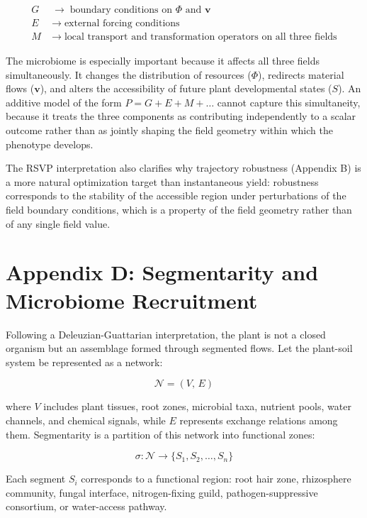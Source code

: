 \documentclass[11pt, a4paper]{article}
\begin{document}
\begin{align*}
G &\;\to\; \text{boundary conditions on } \Phi \text{ and } \mathbf{v} \\
E &\;\to\; \text{external forcing conditions} \\
M &\;\to\; \text{local transport and transformation operators on all three fields}
\end{align*}

The microbiome is especially important because it affects all three fields simultaneously. It changes the distribution of resources ($\Phi$), redirects material flows ($\mathbf{v}$), and alters the accessibility of future plant developmental states ($S$). An additive model of the form $P = G + E + M + \ldots$ cannot capture this simultaneity, because it treats the three components as contributing independently to a scalar outcome rather than as jointly shaping the field geometry within which the phenotype develops.

The RSVP interpretation also clarifies why trajectory robustness (Appendix B) is a more natural optimization target than instantaneous yield: robustness corresponds to the stability of the accessible region under perturbations of the field boundary conditions, which is a property of the field geometry rather than of any single field value.

\bigskip
{}
\section*{Appendix D: Segmentarity and Microbiome Recruitment}

Following a Deleuzian-Guattarian interpretation, the plant is not a closed organism but an assemblage formed through segmented flows. Let the plant-soil system be represented as a network:

\[
\mathcal{N} = (V,\, E)
\]

where $V$ includes plant tissues, root zones, microbial taxa, nutrient pools, water channels, and chemical signals, while $E$ represents exchange relations among them. Segmentarity is a partition of this network into functional zones:

\[
\sigma : \mathcal{N} \to \{S_1, S_2, \ldots, S_n\}
\]

Each segment $S_i$ corresponds to a functional region: root hair zone, rhizosphere community, fungal interface, nitrogen-fixing guild, pathogen-suppressive consortium, or water-access pathway.
\end{document}
